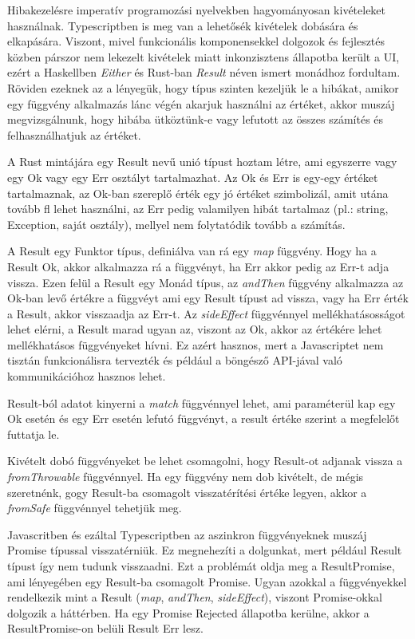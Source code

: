 Hibakezelésre imperatív programozási nyelvekben hagyományosan kivételeket használnak. Typescriptben is meg van a lehetősék kivételek dobására és elkapására. Viszont, mivel funkcionális komponensekkel dolgozok és fejlesztés közben párszor nem lekezelt kivételek miatt inkonzisztens állapotba került a UI, ezért a Haskellben \textit{Either} és Rust-ban \textit{Result} néven ismert monádhoz fordultam. Röviden ezeknek az a lényegük, hogy típus szinten kezeljük le a hibákat, amikor egy függvény alkalmazás lánc végén akarjuk használni az értéket, akkor muszáj megvizsgálnunk, hogy hibába ütköztünk-e vagy lefutott az összes számítés és felhasználhatjuk az értéket.

A Rust mintájára egy Result nevű unió típust\cite{tsUnionTypes} hoztam létre, ami egyszerre vagy egy Ok vagy egy Err osztályt tartalmazhat. Az Ok és Err is egy-egy értéket tartalmaznak, az Ok-ban szereplő érték egy jó értéket szimbolizál, amit utána tovább fl lehet használni, az Err pedig valamilyen hibát tartalmaz (pl.: string, Exception, saját osztály), mellyel nem folytatódik tovább a számítás.

A Result egy Funktor típus, definiálva van rá egy \textit{map} függvény. Hogy ha a Result Ok, akkor alkalmazza rá a függvényt, ha Err akkor pedig az Err-t adja vissza. Ezen felül a Result egy Monád típus, az \textit{andThen} függvény alkalmazza az Ok-ban levő értékre a függvéyt ami egy Result típust ad vissza, vagy ha Err érték a Result, akkor visszaadja az Err-t. Az \textit{sideEffect} függvénnyel mellékhatásosságot lehet elérni, a Result marad ugyan az, viszont az Ok, akkor az értékére lehet mellékhatásos függvényeket hívni. Ez azért hasznos, mert a Javascriptet nem tisztán funkcionálisra tervezték és például a böngésző API-jával való kommunikációhoz hasznos lehet.

Result-ból adatot kinyerni a \textit{match} függvénnyel lehet, ami paraméterül kap egy Ok esetén és egy Err esetén lefutó függvényt, a result értéke szerint a megfelelőt futtatja le.

Kivételt dobó függvényeket be lehet csomagolni, hogy Result-ot adjanak vissza a \textit{fromThrowable} függvénnyel. Ha egy függvény nem dob kivételt, de mégis szeretnénk, gogy Result-ba csomagolt visszatérítési értéke legyen, akkor a \textit{fromSafe} függvénnyel tehetjük meg.

Javascritben és ezáltal Typescriptben az aszinkron függvényeknek muszáj Promise típussal visszatérniük. Ez megnehezíti a dolgunkat, mert például Result típust így nem tudunk visszaadni. Ezt a problémát oldja meg a ResultPromise, ami lényegében egy Result-ba csomagolt Promise. Ugyan azokkal a függvényekkel rendelkezik mint a Result (\textit{map}, \textit{andThen}, \textit{sideEffect}), viszont Promise-okkal dolgozik a háttérben. Ha egy Promise Rejected állapotba kerülne, akkor a ResultPromise-on belüli Result Err lesz.

